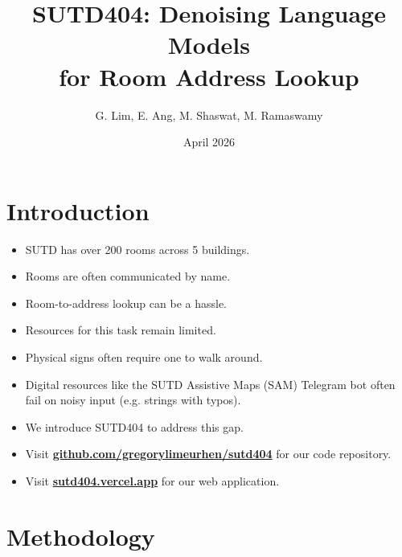 \documentclass[aspectratio=169,notheorems,10pt]{beamer}
\title{SUTD404: Denoising Language Models\\for Room Address Lookup}
\author{
	G. Lim,
	E. Ang,
	M. Shaswat,
	M. Ramaswamy
}
\date{April 2026}
\theoremstyle{definition}
\let\oldhref\href
\renewcommand{\href}[2]{\oldhref{#1}{\textbf{#2}}}
\begin{document}
\maketitle

\section{Introduction}
\begin{frame}
\begin{itemize}
	\item SUTD has over 200 rooms across 5 buildings.
	\item Rooms are often communicated by name.
	\item Room-to-address lookup can be a hassle.
\end{itemize}
\end{frame}

\begin{frame}
\begin{itemize}
	\item Resources for this task remain limited.
	\item Physical signs often require one to walk around.
	\item Digital resources like the SUTD Assistive Maps (SAM) Telegram bot \citep{sam} often fail on noisy input (e.g. strings with typos).
\end{itemize}
\end{frame}

\begin{frame}
\begin{itemize}
	\item We introduce SUTD404 to address this gap.
	\item Visit \href{https://github.com/gregorylimeurhen/sutd404}{github.com/gregorylimeurhen/sutd404} for our code repository.
	\item Visit \href{https://sutd404.vercel.app}{sutd404.vercel.app} for our web application.
\end{itemize}
\end{frame}

\section{Methodology}
\end{document}

